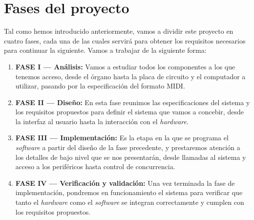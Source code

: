 \section{Fases del proyecto}

Tal como hemos introducido anteriormente, vamos a dividir este proyecto en cuatro fases, cada una de las cuales servirá para obtener los requisitos necesarios para continuar la siguiente. Vamos a trabajar de la siguiente forma:

\begin{enumerate}
	\item \textbf{FASE I --- Análisis:} Vamos a estudiar todos los componentes a los que tenemos acceso, desde el órgano hasta la placa de circuito y el computador a utilizar, pasando por la especificación del formato \acrshort{MIDI}.
	
	\item \textbf{FASE II --- Diseño:} En esta fase reunimos las especificaciones del sistema y los requisitos propuestos para definir el sistema que vamos a concebir, desde la interfaz al usuario hasta la interacción con el \textit{hardware}.
	
	\item \textbf{FASE III --- Implementación:} Es la etapa en la que se programa el \textit{software} a partir del diseño de la fase precedente, y prestaremos atención a los detalles de bajo nivel que se nos presentarán, desde llamadas al sistema y acceso a los periféricos hasta control de concurrencia.
	
	\item \textbf{FASE IV --- Verificación y validación:} Una vez terminada la fase de implementación, pondremos en funcionamiento el sistema para verificar que tanto el \textit{hardware} como el \textit{software} se integran correctamente y cumplen con los requisitos propuestos.
	
\end{enumerate}

\clearpage{\cleardoublepage}
\clearpage{\pagestyle{empty}\cleardoublepage}
